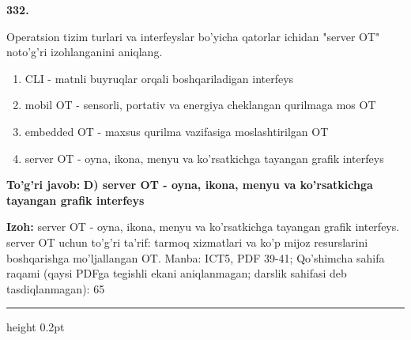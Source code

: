 \documentclass[10pt,a4paper]{article}
\begin{document}
{\bfseries\sffamily\color{ink} 332.}
\par
Operatsion tizim turlari va interfeyslar bo'yicha qatorlar ichidan "server OT" noto'g'ri izohlanganini aniqlang.
\begin{enumerate}[label=\Alph*),leftmargin=9mm]
\item CLI - matnli buyruqlar orqali boshqariladigan interfeys
\item mobil OT - sensorli, portativ va energiya cheklangan qurilmaga mos OT
\item embedded OT - maxsus qurilma vazifasiga moslashtirilgan OT
\item server OT - oyna, ikona, menyu va ko'rsatkichga tayangan grafik interfeys
\end{enumerate}
\begin{tcolorbox}[enhanced,breakable,colback=teal!4,colframe=teal!60!black,boxrule=0.45pt,arc=1.2mm,left=2.7mm,right=2.7mm,top=1.8mm,bottom=1.8mm,before skip=2mm,after skip=2mm]
{\bfseries\sffamily\color{teal}To'g'ri javob:} \textbf{D) server OT - oyna, ikona, menyu va ko'rsatkichga tayangan grafik interfeys}
\par\smallskip
{\bfseries Izoh:} server OT - oyna, ikona, menyu va ko'rsatkichga tayangan grafik interfeys. server OT uchun to'g'ri ta'rif: tarmoq xizmatlari va ko'p mijoz resurslarini boshqarishga mo'ljallangan OT. Manba: ICT5, PDF 39-41; Qo'shimcha sahifa raqami (qaysi PDFga tegishli ekani aniqlanmagan; darslik sahifasi deb tasdiqlanmagan): 65
\end{tcolorbox}
\vspace{2mm}\hrule height 0.2pt\vspace{3mm}
\end{document}
